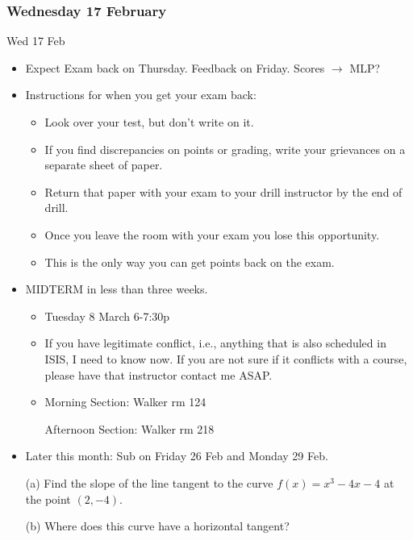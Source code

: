 \documentclass[cal1spr16Lectures.tex]{subfiles}
\begin{document}

\subsubsection{\bf Wednesday 17 February}
\begin{frame}[allowframebreaks]{Wed 17 Feb}
\begin{itemize}\footnotesize
\item Expect Exam back on Thursday.  Feedback on Friday.  Scores $\to$ MLP?
\item \alert{Instructions for when you get your exam back:}
\begin{itemize}\footnotesize
	\item Look over your test, but don't write on it.
	\item If you find discrepancies on points or grading, write your grievances on a separate sheet of paper.
	\item Return that paper with your exam to your drill instructor by the end of drill.
	\item Once you leave the room with your exam you lose this opportunity.
	\item This is the only way you can get points back on the exam.
\end{itemize}
\framebreak
\item MIDTERM in less than three weeks.
\begin{itemize}
	\item Tuesday 8 March 6-7:30p
	\item If you have legitimate conflict, i.e., anything that is also scheduled in ISIS, I need to know now.  If you are not sure if it conflicts with a course, please have that instructor contact me ASAP.
	\item Morning Section: Walker rm 124
	
	Afternoon Section: Walker rm 218
\end{itemize}
\item Later this month: Sub on Friday 26 Feb and Monday 29 Feb.
\end{itemize}
\end{frame}

\begin{frame}{}
\begin{exe} 
	\begin{itemize}
	\item[(a)] Find the slope of the line tangent to the curve $f(x)=x^3-4x-4$ at the point $(2,-4)$. 
	\item[(b)] Where does this curve have a horizontal tangent?
	\end{itemize}
\end{exe}	
\end{frame}
\end{document}
